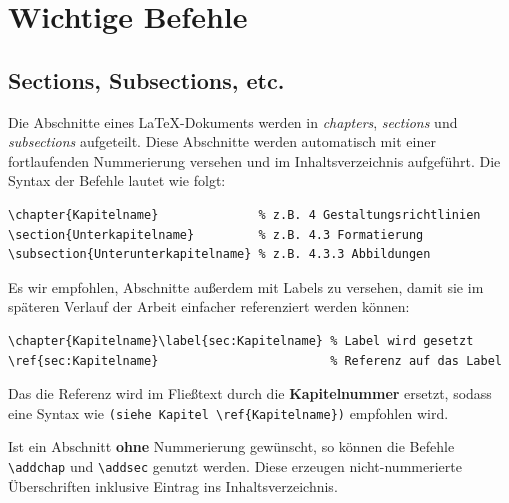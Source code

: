 \section{Wichtige Befehle}

\subsection{Sections, Subsections, etc.}

Die Abschnitte eines \LaTeX-Dokuments werden in \emph{chapters}, \emph{sections} und \emph{subsections} aufgeteilt.
Diese Abschnitte werden automatisch mit einer fortlaufenden Nummerierung versehen und im Inhaltsverzeichnis aufgeführt.
Die Syntax der Befehle lautet wie folgt:

\begin{verbatim}
\chapter{Kapitelname}              % z.B. 4 Gestaltungsrichtlinien
\section{Unterkapitelname}         % z.B. 4.3 Formatierung
\subsection{Unterunterkapitelname} % z.B. 4.3.3 Abbildungen
\end{verbatim}

Es wir empfohlen, Abschnitte außerdem mit Labels zu versehen, damit sie im späteren Verlauf der Arbeit einfacher referenziert werden können:

\begin{verbatim}
\chapter{Kapitelname}\label{sec:Kapitelname} % Label wird gesetzt
\ref{sec:Kapitelname}                        % Referenz auf das Label
\end{verbatim}

Das die Referenz wird im Fließtext durch die \textbf{Kapitelnummer} ersetzt, sodass eine Syntax wie \verb|(siehe Kapitel \ref{Kapitelname})| empfohlen wird.

Ist ein Abschnitt \textbf{ohne} Nummerierung gewünscht, so können die Befehle \verb|\addchap| und \verb|\addsec| genutzt werden. Diese erzeugen nicht-nummerierte Überschriften inklusive Eintrag ins Inhaltsverzeichnis.

